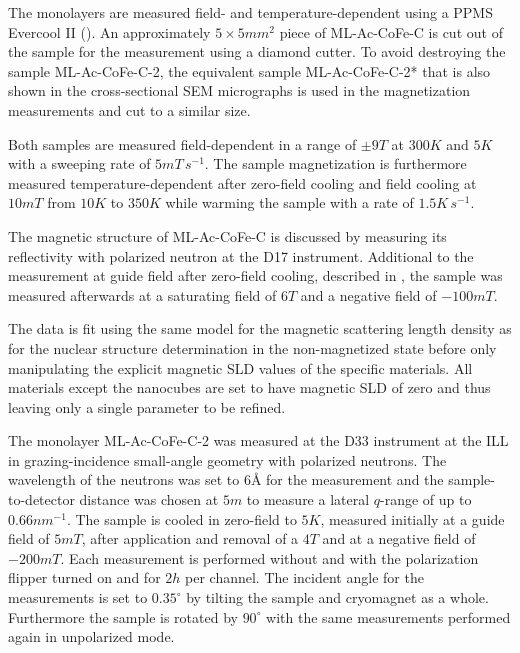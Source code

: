 \documentclass[\main/dresen_thesis.tex]{subfiles}
\begin{document}
    The monolayers are measured field- and temperature-dependent using a PPMS Evercool II ().
    An approximately $5 \times 5 \unit{mm^2}$ piece of ML-Ac-CoFe-C is cut out of the sample for the measurement using a diamond cutter.
    To avoid destroying the sample ML-Ac-CoFe-C-2, the equivalent sample ML-Ac-CoFe-C-2* that is also shown in the cross-sectional SEM micrographs is used in the magnetization measurements and cut to a similar size.

    Both samples are measured field-dependent in a range of $\pm 9 \unit{T}$ at $300 \unit{K}$ and $5 \unit{K}$ with a sweeping rate of $5 \unit{mT \, s^{-1}}$.
    The sample magnetization is furthermore measured temperature-dependent after zero-field cooling and field cooling at $10 \unit{mT}$ from $10 \unit{K}$ to $350 \unit{K}$ while warming the sample with a rate of $1.5 \unit{K \, s^{-1}}$.

    The magnetic structure of ML-Ac-CoFe-C is discussed by measuring its reflectivity with polarized neutron at the D17 instrument.
    Additional to the measurement at guide field after zero-field cooling, described in , the sample was measured afterwards at a saturating field of $6 \unit{T}$ and a negative field of $-100 \unit{mT}$.

    The data is fit using the same model for the magnetic scattering length density as for the nuclear structure determination in the non-magnetized state before only manipulating the explicit magnetic SLD values of the specific materials.
    All materials except the nanocubes are set to have magnetic SLD of zero and thus leaving only a single parameter to be refined.


    The monolayer ML-Ac-CoFe-C-2 was measured at the D33 instrument at the ILL in grazing-incidence small-angle geometry with polarized neutrons.
    The wavelength of the neutrons was set to $6 \unit{\angstrom}$ for the measurement and the sample-to-detector distance was chosen at $5 \unit{m}$ to measure a lateral $q$-range of up to $0.66 \unit{nm^{-1}}$.
    The sample is cooled in zero-field to $5 \unit{K}$, measured initially at a guide field of $5 \unit{mT}$, after application and removal of a $4 \unit{T}$ and at a negative field of $-200 \unit{mT}$.
    Each measurement is performed without and with the polarization flipper turned on and for $2 \unit{h}$ per channel.
    The incident angle for the measurements is set to $0.35 ^\circ$ by tilting the sample and cryomagnet as a whole.
    Furthermore the sample is rotated by $90 ^\circ$ with the same measurements performed again in unpolarized mode.
\end{document}
